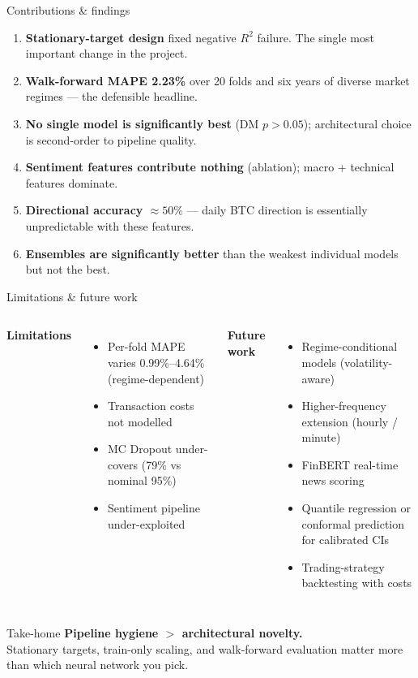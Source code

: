 \documentclass[aspectratio=169]{beamer}
\begin{document}
\begin{frame}{Contributions \& findings}
\begin{enumerate}
  \item \textbf{Stationary-target design} fixed negative $R^2$ failure. The single most important change in the project.
  \item \textbf{Walk-forward MAPE 2.23\%} over 20 folds and six years of diverse market regimes --- the defensible headline.
  \item \textbf{No single model is significantly best} (DM $p > 0.05$); architectural choice is second-order to pipeline quality.
  \item \textbf{Sentiment features contribute nothing} (ablation); macro + technical features dominate.
  \item \textbf{Directional accuracy $\approx 50\%$} --- daily BTC direction is essentially unpredictable with these features.
  \item \textbf{Ensembles are significantly better} than the weakest individual models but not the best.
\end{enumerate}
\end{frame}

\begin{frame}{Limitations \& future work}
\begin{columns}[T,onlytextwidth]
\textbf{Limitations}
\begin{itemize}\small
  \item Per-fold MAPE varies 0.99\%--4.64\% (regime-dependent)
  \item Transaction costs not modelled
  \item MC Dropout under-covers (79\% vs nominal 95\%)
  \item Sentiment pipeline under-exploited
\end{itemize}

\textbf{Future work}
\begin{itemize}\small
  \item Regime-conditional models (volatility-aware)
  \item Higher-frequency extension (hourly / minute)
  \item FinBERT real-time news scoring
  \item Quantile regression or conformal prediction for calibrated CIs
  \item Trading-strategy backtesting with costs
\end{itemize}
\end{columns}

\vspace{0.5cm}
\centering
\begin{block}{Take-home}
\centering
\textbf{Pipeline hygiene $>$ architectural novelty.}
\\[0.1cm] Stationary targets, train-only scaling, and walk-forward evaluation matter more than which neural network you pick.
\end{block}
\end{frame}
\end{document}
